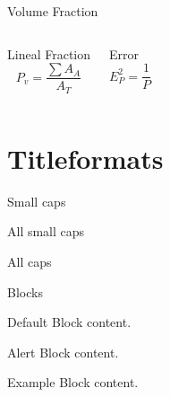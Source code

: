 \documentclass[10pt]{beamer}
\begin{document}
{\begin{frame}[fragile]{Volume Fraction}
\begin{columns}[T,onlytextwidth]
\end{columns}

  \begin{columns}[T,onlytextwidth]
\begin{block}{Lineal Fraction}
\begin{equation*}
P_{v} = \dfrac{\sum A_{A}}{A_{T}}
\end{equation*} 
\end{block}
 

\begin{block}{Error}
\begin{equation*}
E_{P}^{2} = \dfrac{1}{P}
\end{equation*} 
\end{block}

\end{columns}


 
    
\end{frame}
}
\section{Titleformats}



{
\begin{frame}{Small caps}

\end{frame}
}

{
\begin{frame}{All small caps}

\end{frame}
}
{
\begin{frame}{All caps}

\end{frame}
}

\begin{frame}{Blocks}
 

      \begin{block}{Default}
        Block content.
      \end{block}

      \begin{alertblock}{Alert}
        Block content.
      \end{alertblock}

      \begin{exampleblock}{Example}
        Block content.
      \end{exampleblock}


\end{frame}
\end{document}
